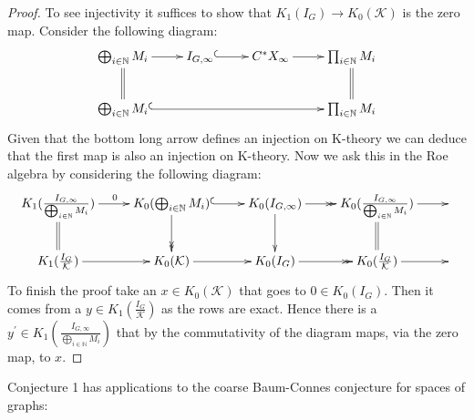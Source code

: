 \begin{proof}
To see injectivity it suffices to show that $K_{1}(I_{G})\rightarrow K_{0}(\mathcal{K})$ is the zero map. Consider the following diagram:
\begin{equation*}
\xymatrix{\bigoplus_{i \in \mathbb{N}} M_{i} \ar@{->}[r]\ar@{=}[d]  & I_{G,\infty} \ar@{^{(}->}[r]& C^{*}X_{\infty} \ar@{->}[r]& \prod_{i\in \mathbb{N}}M_{i}\ar@{=}[d]\\
\bigoplus_{i \in \mathbb{N}} M_{i}\ar@{^{(}->}[rrr] & & & \prod_{i\in \mathbb{N}}M_{i}
}
\end{equation*}
Given that the bottom long arrow defines an injection on K-theory we can deduce that the first map is also an injection on K-theory. Now we ask this in the Roe algebra by considering the following diagram:
\begin{equation*}
\xymatrix{K_{1}(\frac{I_{G,\infty}}{\bigoplus_{i\in\mathbb{N}}M_{i}})\ar@{->}[r]^{0}\ar@{=}[d]& K_{0}(\bigoplus_{i\in \mathbb{N}}M_{i}) \ar@{^{(}->}[r]\ar@{->>}[d] & K_{0}(I_{G,\infty}) \ar@{->>}[r] \ar@{->}[d] & K_{0}(\frac{I_{G,\infty}}{\bigoplus_{i\in\mathbb{N}}M_{i}})\ar@{=}[d]\ar@{->}[r]&\\
K_{1}(\frac{I_{G}}{\mathcal{K}})\ar@{->}[r]& K_{0}(\mathcal{K}) \ar@{->}[r] & K_{0}(I_{G}) \ar@{->>}[r]  & K_{0}(\frac{I_{G}}{\mathcal{K}})\ar@{->}[r]
&}
\end{equation*}
To finish the proof take an $x \in K_{0}(\mathcal{K})$ that goes to $0 \in K_{0}(I_{G})$. Then it comes from a $y \in K_{1}(\frac{I_{G}}{\mathcal{K}})$ as the rows are exact. Hence there is a $y^{'} \in K_{1}(\frac{I_{G,\infty}}{\bigoplus_{i\in\mathbb{N}}M_{i}})$ that by the commutativity of the diagram maps, via the zero map, to $x$.
\end{proof}

Conjecture 1 has applications to the coarse Baum-Connes conjecture for spaces of graphs:

